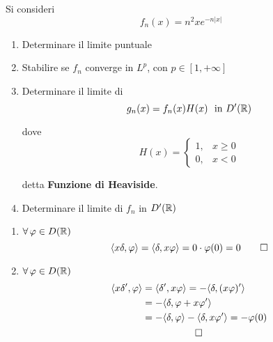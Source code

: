 Si consideri
\begin{equation*}
f_{n}(x) = n^{2} xe^{- n| x|}
\end{equation*}
\begin{enumerate}
\item Determinare il limite puntuale
\item Stabilire se $f_{n}$ converge in $L^{p}$, con $p\in [ 1, + \infty ]$
\item Determinare il limite di
\begin{equation*}
g_{n}(x) = f_{n}(x) H(x) \ \ \text{in} \ D'(\mathbb{R})
\end{equation*}

dove
\begin{equation*}
H(x) = 
\begin{cases}
1, & x \geq 0\\
0, & x < 0
\end{cases}
\end{equation*}

detta \textbf{Funzione di Heaviside}.
\item Determinare il limite di $f_{n}$ in $D'(\mathbb{R})$
\end{enumerate}
\ParteSoluzioni
\Soluzione
\begin{enumerate}
\item $\forall \varphi \in D(\RR)$
\begin{equation*}
\langle x\delta, \varphi \rangle = \langle \delta, x\varphi \rangle = 0 \cdot \varphi (0) = 0\qed 
\end{equation*}
\item $\forall \varphi \in D(\RR)$
\begin{gather*}
\begin{aligned}
\langle x\delta ', \varphi \rangle  & = \langle \delta ', x\varphi \rangle = - \langle \delta, (x\varphi) '\rangle \\
 & = - \langle \delta, \varphi + x\varphi '\rangle \\
 & = - \langle \delta, \varphi \rangle - \langle \delta, x\varphi '\rangle = - \varphi (0)
\end{aligned}\\
\qed 
\end{gather*}
\end{enumerate}
\Soluzione

